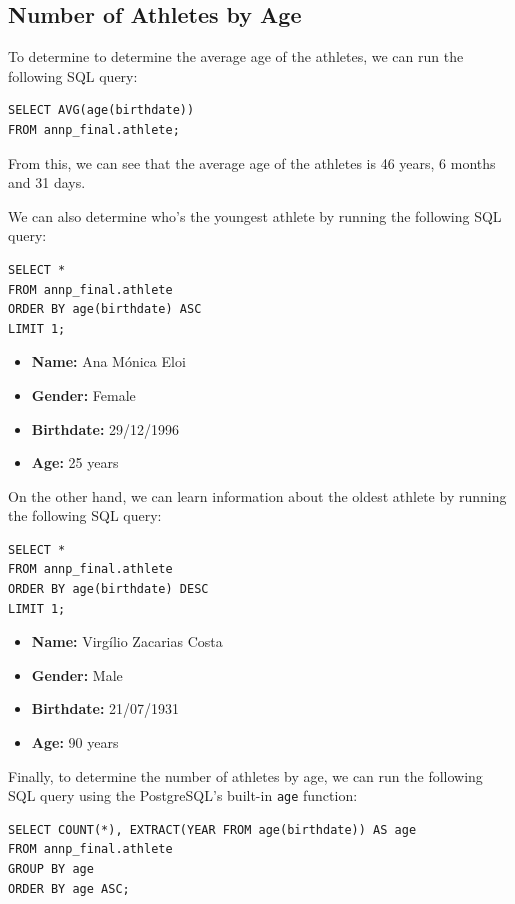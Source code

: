 \subsection{Number of Athletes by Age}\label{subsec:number-of-athletes-by-age}

To determine to determine the average age of the athletes, we can run the following SQL query:

\begin{verbatim}
SELECT AVG(age(birthdate))
FROM annp_final.athlete;
\end{verbatim}

From this, we can see that the average age of the athletes is 46 years, 6 months and 31 days.

We can also determine who's the youngest athlete by running the following SQL query:

\begin{verbatim}
SELECT *
FROM annp_final.athlete
ORDER BY age(birthdate) ASC
LIMIT 1;
\end{verbatim}

\begin{itemize}
    \item \textbf{Name:} Ana Mónica Eloi
    \item \textbf{Gender:} Female
    \item \textbf{Birthdate:} 29/12/1996
    \item \textbf{Age:} 25 years
\end{itemize}

On the other hand, we can learn information about the oldest athlete by running the following SQL query:

\begin{verbatim}
SELECT *
FROM annp_final.athlete
ORDER BY age(birthdate) DESC
LIMIT 1;
\end{verbatim}

\begin{itemize}
    \item \textbf{Name:} Virgílio Zacarias Costa
    \item \textbf{Gender:} Male
    \item \textbf{Birthdate:} 21/07/1931
    \item \textbf{Age:} 90 years
\end{itemize}

Finally, to determine the number of athletes by age, we can run the following SQL query using the PostgreSQL's built-in
\texttt{age} function:

\begin{verbatim}
SELECT COUNT(*), EXTRACT(YEAR FROM age(birthdate)) AS age
FROM annp_final.athlete
GROUP BY age
ORDER BY age ASC;
\end{verbatim}

